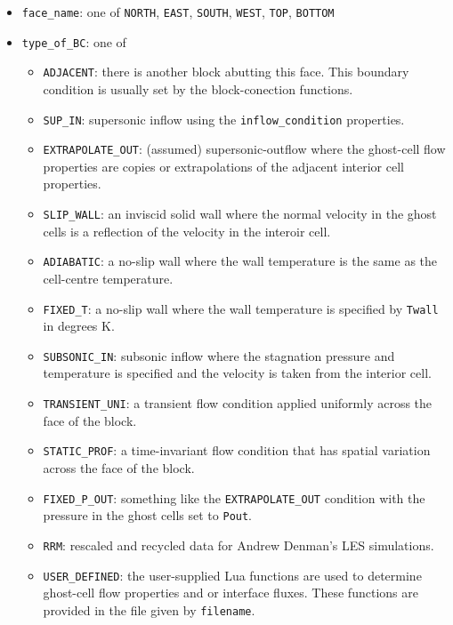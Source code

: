 \documentclass[12pt,a4paper,twoside]{article}
\begin{document}
\begin{itemize}
  \item \texttt{face\_name}: one of \texttt{NORTH}, \texttt{EAST},
    \texttt{SOUTH}, \texttt{WEST}, \texttt{TOP}, \texttt{BOTTOM}
  \item \texttt{type\_of\_BC}: one of 
    \begin{itemize}
      \item \texttt{ADJACENT}: there is another block abutting this face.
        This boundary condition is usually set by the block-conection functions.
      \item \texttt{SUP\_IN}: supersonic inflow using the
        \texttt{inflow\_condition} properties.
      \item \texttt{EXTRAPOLATE\_OUT}: (assumed) supersonic-outflow where the
        ghost-cell flow properties are copies or extrapolations 
        of the adjacent interior cell properties.
      \item \texttt{SLIP\_WALL}: an inviscid solid wall where the normal
        velocity in the ghost cells is a reflection of the velocity in the
        interoir cell.
      \item \texttt{ADIABATIC}: a no-slip wall where the wall temperature is
        the same as the cell-centre temperature.
      \item \texttt{FIXED\_T}: a no-slip wall where the wall temperature is
        specified by \texttt{Twall} in degrees K.
      \item \texttt{SUBSONIC\_IN}: subsonic inflow where the stagnation
        pressure and temperature is specified and the velocity is taken from
        the interior cell.
      \item \texttt{TRANSIENT\_UNI}: a transient flow condition applied
        uniformly across the face of the block.
      \item \texttt{STATIC\_PROF}: a time-invariant flow condition that has
        spatial variation across the face of the block.
      \item \texttt{FIXED\_P\_OUT}: something like the \texttt{EXTRAPOLATE\_OUT}
        condition with the pressure in the ghost cells set to \texttt{Pout}.
      \item \texttt{RRM}: rescaled and recycled data for Andrew Denman's LES simulations.
      \item \texttt{USER\_DEFINED}: the user-supplied Lua functions are used to
        determine ghost-cell flow properties and or interface fluxes.
        These functions are provided in the file given by \texttt{filename}.

\end{itemize}
\end{itemize}
\end{document}

